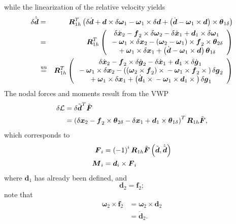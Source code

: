 \documentclass[10pt,dvips,fleqn]{report}
\newcommand{\T}[1]{\boldsymbol{#1}}
\newcommand{\equu}{\overset{\mathrm{uu}}{=}}
\begin{document}
while the linearization of the relative velocity yields
\begin{eqnarray*}
	\delta\dot{\tilde{\T{d}}} & = & \T{R}_{1h}^T\plbr{
		\delta\dot{\T{d}}
		+ \T{d} \times \delta\T{\omega}_1
		- \T{\omega}_1 \times \delta\T{d}
		+ \plbr{
			\dot{\T{d}}
			- \T{\omega}_1 \times \T{d}
		}\times\T{\theta}_{1\delta}
	} \\
	& = & \T{R}_{1h}^T\plbr{\cvvect{
		\delta\dot{\T{x}}_2
		- \T{f}_2\times\delta\T{\omega}_2
		- \delta\dot{\T{x}}_1
		+ \T{d}_1\times\delta\T{\omega}_1 \\
	\mbox{} - \T{\omega}_1 \times \delta\T{x}_2
		- \plbr{
			\T{\omega}_2 
			- \T{\omega}_1
		} \times \T{f}_2 \times\T{\theta}_{2\delta} \\
	\mbox{} + \T{\omega}_1 \times \delta\T{x}_1
		+ \plbr{
			\dot{\T{d}} - \T{\omega}_1 \times \T{d}
		} \T{\theta}_{1\delta}
	}} \\
	& \equu & \T{R}_{1h}^T\plbr{\cvvect{
		\delta\dot{\T{x}}_2
		- \T{f}_2\times\delta\dot{\T{g}}_2
		- \delta\dot{\T{x}}_1
		+ \T{d}_1\times\delta\dot{\T{g}}_1 \\
	\mbox{} - \T{\omega}_1 \times \delta\T{x}_2
		- \plbr{
			\plbr{\T{\omega}_2 \times \T{f}_2}\times{}
			- \T{\omega}_1 \times \T{f}_2 \times{}
		} \delta\T{g}_2 \\
	\mbox{} + \T{\omega}_1 \times \delta\T{x}_1
		+ \plbr{
			\dot{\T{d}}_1 \times{}
			- \T{\omega}_1 \times \T{d}_1\times{}
		} \delta\T{g}_1
	}}
\end{eqnarray*}
The nodal forces and moments result from the VWP
\begin{align}
	\delta\mathcal{L} &= \delta \tilde{\T{d}}^T \tilde{\T{F}} \\
	&= \plbr{
		\delta{\T{x}}_2
		- \T{f}_2\times\T{\theta}_{2\delta}
		- \delta{\T{x}}_1
		+ \T{d}_1\times\T{\theta}_{1\delta}
	}^T \T{R}_{1h} \tilde{\T{F}} ,
\end{align}
which corresponds to
\begin{align}
	\T{F}_i &= \plbr{ -1 }^i \T{R}_{1h} \tilde{\T{F}}\plbr{\tilde{\T{d}}, \dot{\tilde{\T{d}}}} \\
	\T{M}_i &= \T{d}_i \times \T{F}_i
\end{align}
where $\T{d}_1$ has already been defined, and
\begin{equation}
	\T{d}_2 = \T{f}_2 ;
\end{equation}
note that
\begin{align}
	\T{\omega}_2\times\T{f}_2
	&= \T{\omega}_2\times\T{d}_2 \\
	&= \dot{\T{d}}_2 .
\end{align}
\end{document}

